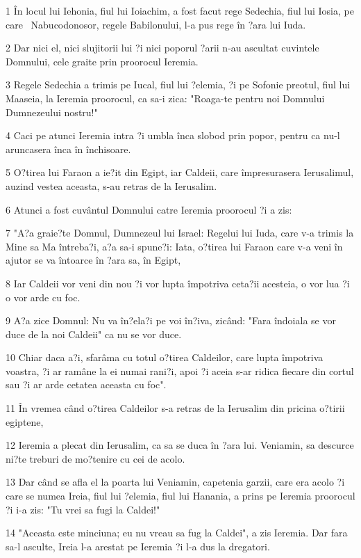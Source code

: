 \par 1 În locul lui Iehonia, fiul lui Ioiachim, a fost facut rege Sedechia, fiul lui Iosia, pe care  Nabucodonosor, regele Babilonului, l-a pus rege în ?ara lui Iuda.
\par 2 Dar nici el, nici slujitorii lui ?i nici poporul ?arii n-au ascultat cuvintele Domnului, cele graite prin proorocul Ieremia.
\par 3 Regele Sedechia a trimis pe Iucal, fiul lui ?elemia, ?i pe Sofonie preotul, fiul lui Maaseia, la Ieremia proorocul, ca sa-i zica: "Roaga-te pentru noi Domnului Dumnezeului nostru!"
\par 4 Caci pe atunci Ieremia intra ?i umbla înca slobod prin popor, pentru ca nu-l aruncasera înca în închisoare.
\par 5 O?tirea lui Faraon a ie?it din Egipt, iar Caldeii, care împresurasera Ierusalimul, auzind vestea aceasta, s-au retras de la Ierusalim.
\par 6 Atunci a fost cuvântul Domnului catre Ieremia proorocul ?i a zis:
\par 7 "A?a graie?te Domnul, Dumnezeul lui Israel: Regelui lui Iuda, care v-a trimis la Mine sa Ma întreba?i, a?a sa-i spune?i: Iata, o?tirea lui Faraon care v-a veni în ajutor se va întoarce în ?ara sa, în Egipt,
\par 8 Iar Caldeii vor veni din nou ?i vor lupta împotriva ceta?ii acesteia, o vor lua ?i o vor arde cu foc.
\par 9 A?a zice Domnul: Nu va în?ela?i pe voi în?iva, zicând: "Fara îndoiala se vor duce de la noi Caldeii" ca nu se vor duce.
\par 10 Chiar daca a?i, sfarâma cu totul o?tirea Caldeilor, care lupta împotriva voastra, ?i ar ramâne la ei numai rani?i, apoi ?i aceia s-ar ridica fiecare din cortul sau ?i ar arde cetatea aceasta cu foc".
\par 11 În vremea când o?tirea Caldeilor s-a retras de la Ierusalim din pricina o?tirii egiptene,
\par 12 Ieremia a plecat din Ierusalim, ca sa se duca în ?ara lui. Veniamin, sa descurce ni?te treburi de mo?tenire cu cei de acolo.
\par 13 Dar când se afla el la poarta lui Veniamin, capetenia garzii, care era acolo ?i care se numea Ireia, fiul lui ?elemia, fiul lui Hanania, a prins pe Ieremia proorocul ?i i-a zis: "Tu vrei sa fugi la Caldei!"
\par 14 "Aceasta este minciuna; eu nu vreau sa fug la Caldei", a zis Ieremia. Dar fara sa-l asculte, Ireia l-a arestat pe Ieremia ?i l-a dus la dregatori.
